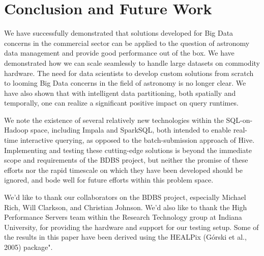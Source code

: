 \documentclass[11pt,twoside]{article}
\begin{document}

\section{Conclusion and Future Work}

We have successfully demonstrated that solutions developed for Big Data concerns in the commercial sector can
be applied to the question of astronomy data management and provide good performance out of the box.  We have
demonstrated how we can scale seamlessly to handle large datasets on commodity hardware.  The need for data
scientists to develop custom solutions from scratch to looming Big Data concerns in the field of astronomy is
no longer clear.  We have also shown that with intelligent data partitioning, both spatially and temporally,
one can realize a significant positive impact on query runtimes.

We note the existence of several relatively new technologies within the SQL-on-Hadoop space, including Impala
and SparkSQL, both intended to enable real-time interactive querying, as opposed to the batch-submission
approach of Hive.  Implementing and testing these cutting-edge solutions is beyond the immediate scope and
requirements of the BDBS project, but neither the promise of these efforts nor the rapid timescale on which
they have been developed should be ignored, and bode well for future efforts within this problem space.

\acknowledgements We'd like to thank our collaborators on the BDBS project, especially Michael Rich, Will
Clarkson, and Christian Johnson.  We'd also like to thank the High Performance Servers team within the
Research Technology group at Indiana University, for providing the hardware and support for our testing
setup. Some of the results in this paper have been derived using the HEALPix (Górski et al., 2005) package".


\end{document}
